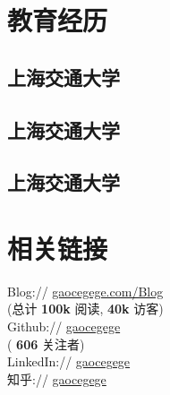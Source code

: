 \documentclass[]{deedy-resume-openfont}
\begin{document}
%
%
\lastupdated


%
%

\begin{minipage}[t]{0.3\textwidth}


\section{教育经历}
\sectionsep

\subsection{上海交通大学}
\sectionsep

\subsection{上海交通大学}
\sectionsep

\subsection{上海交通大学}
\sectionsep


\section{相关链接}
\sectionsep
Blog://  \href{http://gaocegege.com/Blog}{gaocegege.com/Blog} \\
{(总计\textbf{ 100k }阅读,\textbf{ 40k }访客)} \\
Github:// \href{https://github.com/gaocegege}{gaocegege} \\
{(\textbf{ 606 }关注者)} \\
LinkedIn://  \href{https://www.linkedin.com/in/gaocegege}{gaocegege} \\
知乎:// \href{https://www.zhihu.com/people/gaocegege}{gaocegege} \\
\sectionsep


\end{minipage}
\end{document}

